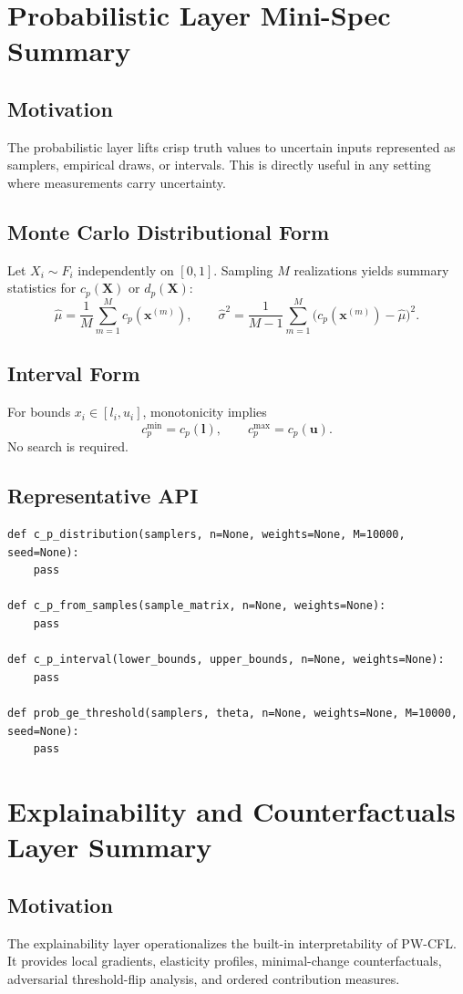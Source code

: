 \documentclass[11pt]{article}
\begin{document}
\section{Probabilistic Layer Mini-Spec Summary}
\subsection{Motivation}
The probabilistic layer lifts crisp truth values to uncertain inputs represented as samplers, empirical draws, or intervals. This is directly useful in any setting where measurements carry uncertainty.

\subsection{Monte Carlo Distributional Form}
Let $X_i \sim F_i$ independently on $[0,1]$. Sampling $M$ realizations yields summary statistics for $c_p(\mathbf{X})$ or $d_p(\mathbf{X})$:
\[
\hat{\mu} = \frac{1}{M}\sum_{m=1}^{M} c_p(\mathbf{x}^{(m)}),
\qquad
\hat{\sigma}^2 = \frac{1}{M-1}\sum_{m=1}^{M}\bigl(c_p(\mathbf{x}^{(m)})-\hat{\mu}\bigr)^2.
\]

\subsection{Interval Form}
For bounds $x_i \in [l_i,u_i]$, monotonicity implies
\[
 c_p^{\min} = c_p(\mathbf{l}), \qquad c_p^{\max} = c_p(\mathbf{u}).
\]
No search is required.

\subsection{Representative API}
\begin{lstlisting}[style=pystyle]
def c_p_distribution(samplers, n=None, weights=None, M=10000, seed=None):
    pass

def c_p_from_samples(sample_matrix, n=None, weights=None):
    pass

def c_p_interval(lower_bounds, upper_bounds, n=None, weights=None):
    pass

def prob_ge_threshold(samplers, theta, n=None, weights=None, M=10000, seed=None):
    pass
\end{lstlisting}

\section{Explainability and Counterfactuals Layer Summary}
\subsection{Motivation}
The explainability layer operationalizes the built-in interpretability of PW-CFL. It provides local gradients, elasticity profiles, minimal-change counterfactuals, adversarial threshold-flip analysis, and ordered contribution measures.
\end{document}

